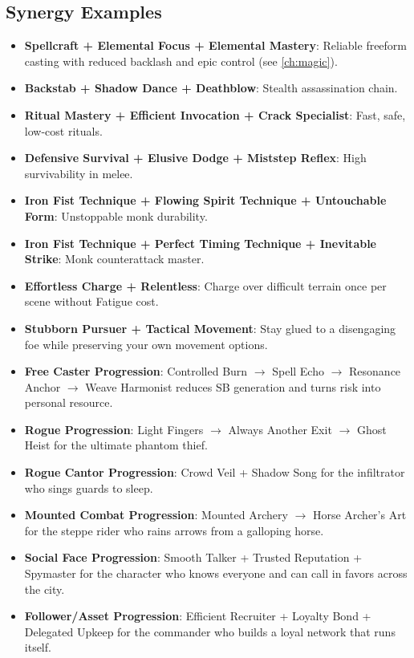 {{\subsection*{Synergy Examples}
\label{sec:synergy-examples}
\begin{itemize}
  \item \textbf{Spellcraft + Elemental Focus + Elemental Mastery}: Reliable freeform casting with reduced backlash and epic control (see \ref{ch:magic}).
  \item \textbf{Backstab + Shadow Dance + Deathblow}: Stealth assassination chain.
  \item \textbf{Ritual Mastery + Efficient Invocation + Crack Specialist}: Fast, safe, low-cost rituals.
  \item \textbf{Defensive Survival + Elusive Dodge + Miststep Reflex}: High survivability in melee.
  \item \textbf{Iron Fist Technique + Flowing Spirit Technique + Untouchable Form}: Unstoppable monk durability.
  \item \textbf{Iron Fist Technique + Perfect Timing Technique + Inevitable Strike}: Monk counterattack master.
  \item \textbf{Effortless Charge + Relentless}: Charge over difficult terrain once per scene without Fatigue cost.
  \item \textbf{Stubborn Pursuer + Tactical Movement}: Stay glued to a disengaging foe while preserving your own movement options.
  \item \textbf{Free Caster Progression}: Controlled Burn $\rightarrow$ Spell Echo $\rightarrow$ Resonance Anchor $\rightarrow$ Weave Harmonist reduces SB generation and turns risk into personal resource.
  \item \textbf{Rogue Progression}: Light Fingers $\rightarrow$ Always Another Exit $\rightarrow$ Ghost Heist for the ultimate phantom thief.
  \item \textbf{Rogue Cantor Progression}: Crowd Veil + Shadow Song for the infiltrator who sings guards to sleep.
  \item \textbf{Mounted Combat Progression}: Mounted Archery $\rightarrow$ Horse Archer's Art for the steppe rider who rains arrows from a galloping horse.
  \item \textbf{Social Face Progression}: Smooth Talker + Trusted Reputation + Spymaster for the character who knows everyone and can call in favors across the city.
  \item \textbf{Follower/Asset Progression}: Efficient Recruiter + Loyalty Bond + Delegated Upkeep for the commander who builds a loyal network that runs itself.

\end{itemize}}}
